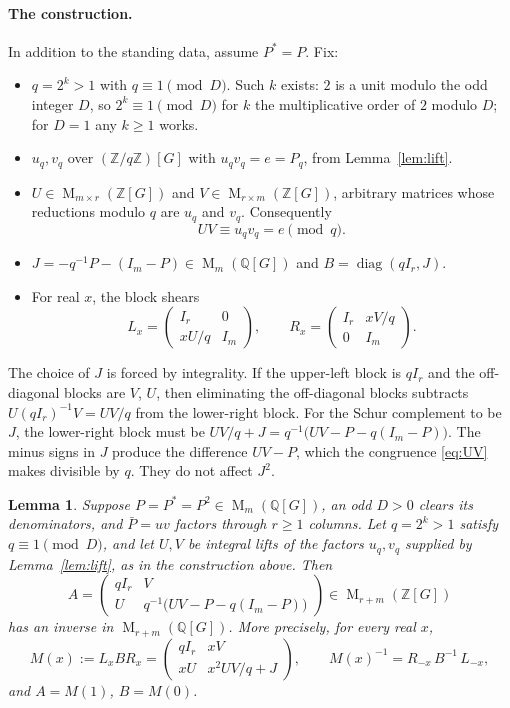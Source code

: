 \documentclass[11pt]{article}
\newtheorem{lemma}[theorem]{Lemma}
\theoremstyle{remark}
\numberwithin{equation}{section}
\newcommand{\Z}{\mathbb Z}
\newcommand{\Q}{\mathbb Q}
\newcommand{\Mat}{\operatorname{M}}
\newcommand{\diag}{\operatorname{diag}}
\begin{document}
\paragraph{The construction.}
In addition to the standing data, assume $P^*=P$. Fix:
\begin{itemize}[leftmargin=2em]
\item $q=2^k>1$ with $q\equiv1\pmod D$. Such $k$ exists: $2$ is a unit modulo the odd integer $D$, so $2^k\equiv1\pmod D$ for $k$ the multiplicative order of $2$ modulo $D$; for $D=1$ any $k\ge1$ works.
\item $u_q,v_q$ over $(\Z/q\Z)[G]$ with $u_qv_q=e=P_q$, from Lemma~\ref{lem:lift}.
\item $U\in\Mat_{m\times r}(\Z[G])$ and $V\in\Mat_{r\times m}(\Z[G])$, arbitrary matrices whose reductions modulo $q$ are $u_q$ and $v_q$. Consequently
\begin{equation}\label{eq:UV}
 UV\equiv u_qv_q=e\pmod q .
\end{equation}
\item $J=-q^{-1}P-(I_m-P)\in\Mat_m(\Q[G])$ and $B=\diag(qI_r,J)$.
\item For real $x$, the block shears
\[
 L_x=\begin{pmatrix}I_r&0\\xU/q&I_m\end{pmatrix},\qquad
 R_x=\begin{pmatrix}I_r&xV/q\\0&I_m\end{pmatrix}.
\]
\end{itemize}
The choice of $J$ is forced by integrality. If the upper-left block is $qI_r$ and the off-diagonal blocks are $V$, $U$, then eliminating the off-diagonal blocks subtracts $U(qI_r)^{-1}V=UV/q$ from the lower-right block. For the Schur complement to be $J$, the lower-right block must be $UV/q+J=q^{-1}\bigl(UV-P-q(I_m-P)\bigr)$. The minus signs in $J$ produce the difference $UV-P$, which the congruence \eqref{eq:UV} makes divisible by $q$. They do not affect $J^2$.

\begin{lemma}\label{lem:integral}
Suppose $P=P^*=P^2\in\Mat_m(\Q[G])$, an odd $D>0$ clears its
denominators, and $\bar P=uv$ factors through $r\ge1$ columns.
Let $q=2^k>1$ satisfy $q\equiv1\pmod D$, and let $U,V$ be
integral lifts of the factors $u_q,v_q$ supplied by Lemma~\ref{lem:lift}, as in the construction above.
Then
\begin{equation}\label{eq:integral-matrix}
 A=\begin{pmatrix}
 qI_r&V\\
 U&q^{-1}\bigl(UV-P-q(I_m-P)\bigr)
 \end{pmatrix}
 \in\Mat_{r+m}(\Z[G])
\end{equation}
has an inverse in $\Mat_{r+m}(\Q[G])$. More precisely, for every real $x$,
\begin{equation}\label{eq:path}
 M(x):=L_xBR_x=
 \begin{pmatrix}qI_r&xV\\xU&x^2UV/q+J\end{pmatrix},
 \qquad M(x)^{-1}=R_{-x}\,B^{-1}\,L_{-x},
\end{equation}
and $A=M(1)$, $B=M(0)$.
\end{lemma}
\end{document}
